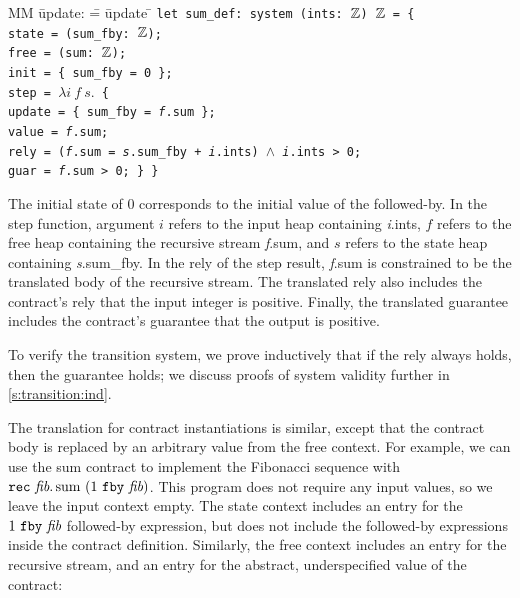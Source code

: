 \documentclass[a4paper,UKenglish,cleveref, autoref, thm-restate,anonymous]{lipics-v2021}
\begin{document}
  \begin{tabbing}
  MM \= update: \= = \= update \= \kill
  \tt{let} sum_def: system (ints: $\mathbb{Z}$) $\mathbb{Z}$ = \{ \\
  \> state   \> = (sum_fby: $\mathbb{Z}$); \\
  \> free  \> = (sum: $\mathbb{Z}$); \\
  \> init  \> = \{ sum_fby = 0 \}; \\
  \> step  \> = $\lambda{} i~f~s.$ \{ \\
  \> \> \> update \> = \{ sum_fby = \textit{f}.sum \}; \\
  \> \> \> value  \> = \textit{f}.sum; \\
  \> \> \> rely   \> = (\textit{f}.sum = \textit{s}.sum_fby + \textit{i}.ints) $\wedge$ \textit{i}.ints > 0; \\
  \> \> \> guar   \> = \textit{f}.sum > 0; \} \}
  \end{tabbing}

The initial state of 0 corresponds to the initial value of the followed-by.
In the step function, argument $i$ refers to the input heap containing \textit{i}.ints, $f$ refers to the free heap containing the recursive stream \textit{f}.sum, and $s$ refers to the state heap containing \textit{s}.sum_fby.
In the rely of the step result, \textit{f}.sum is constrained to be the translated body of the recursive stream.
The translated rely also includes the contract's rely that the input integer is positive.
Finally, the translated guarantee includes the contract's guarantee that the output is positive.

To verify the transition system, we prove inductively that if the rely always holds, then the guarantee holds; we discuss proofs of system validity further in \autoref{s:transition:ind}.

The translation for contract instantiations is similar, except that the contract body is replaced by an arbitrary value from the free context.
For example, we can use the sum contract to implement the Fibonacci sequence with
$
  \texttt{rec}~\textit{fib}.\, \text{sum}~(1~\texttt{fby}~\textit{fib})
$.
This program does not require any input values, so we leave the input context empty.
The state context includes an entry for the $1~\texttt{fby}~\textit{fib}$ followed-by expression, but does not include the followed-by expressions inside the contract definition.
Similarly, the free context includes an entry for the recursive stream, and an entry for the abstract, underspecified value of the contract:
\end{document}
